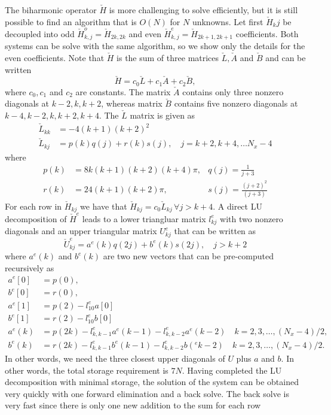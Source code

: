 \documentclass[11pt, oneside]{article}
\newcommand{\N}[1]{\check{#1}}
\begin{document}
The biharmonic operator $\N{H}$ is more challenging to solve efficiently, but 
it is still possible to find an algorithm that is $O(N)$ for $N$ unknowns. Let 
first $\N{H}_kj$ be decoupled into odd $\N{H}^o_{k,j}= \N{H}_{2k,2k}$ and even 
$\N{H}^e_{k,j}= \N{H}_{2k+1,2k+1}$ coefficients. Both systems can be solve with 
the same algorithm, so we show only the details for the even coefficients. Note 
that $\N{H}$ is the sum of three matrices $\N{L}, \N{A}$ and $\N{B}$ and can be 
written
\begin{equation}
\N{H} = c_0\N{L} + c_1\N{A} + c_2 \N{B},
\end{equation}
where $c_0, c_1$ and $c_2$ are constants. The matrix $\N{A}$ contains only 
three nonzero diagonals at $k-2, k, k+2$,  whereas matrix $\N{B}$ contains five 
nonzero diagonals at $k-4, k-2, k, k+2, k+4$. The $\N{L}$ matrix is given as
\begin{align}
 \N{L}_{kk} &= -4(k+1)(k+2)^2 \\
 \N{L}_{kj} &= p(k)q(j) + r(k)s(j), \quad j = k+2, k+4, \ldots N_x-4
\end{align}
where 
\begin{align}
p(k) &= 8 k (k+1)(k+2)(k+4)\pi, &q(j) = \frac{1}{j+3} \\
r(k) &= 24(k+1)(k+2)\pi, &s(j) =  \frac{(j+2)^2}{(j+3)}
\end{align} 
For each row in $\N{H}_{kj}$ we have that $\N{H}_{kj}=c_0\N{L}_{kj}\, \forall j 
> k+4$. A direct LU decomposition of $\N{H}^e$ leads to a lower triangluar 
matrix $l^e_{kj}$ with two nonzero diagonals and an upper triangular matrix 
$U^e_{kj}$ that can be written as
\begin{equation}
\N{U}^e_{kj} = a^e(k)q(2j) + b^e(k)s(2j), \quad j > k+2
\end{equation}
where $a^e(k)$ and $b^e(k)$ are two new vectors that can be pre-computed 
recursively as
\begin{align}
a^e[0] &= p(0),\\
b^e[0] &= r(0), \\
a^e[1] &= p(2) - l^e_{10}a[0]\\
b^e[1] &= r(2) - l^e_{10}b[0]\\
a^e(k) &= p(2k) - l^e_{k,k-1} a^e(k-1) - l^e_{k,k-2}a^e(k-2) \quad k = 2, 3, 
\ldots, (N_x-4)/2, \\
b^e(k) &= r(2k) - l^e_{k,k-1} b^e(k-1) - l^e_{k,k-2}b(^ek-2)\quad k = 2, 3, 
\ldots, (N_x-4)/2.
\end{align}
In other words, we need the three closest upper diagonals of $U$ plus $a$ and 
$b$. In other words, the total storage requirement is $7N$. Having completed 
the LU decomposition with minimal storage, the solution of the system can be 
obtained very quickly with one forward elimination and a back solve. The back 
solve is very fast since there is only one new addition to the sum for each row 
\end{document}
